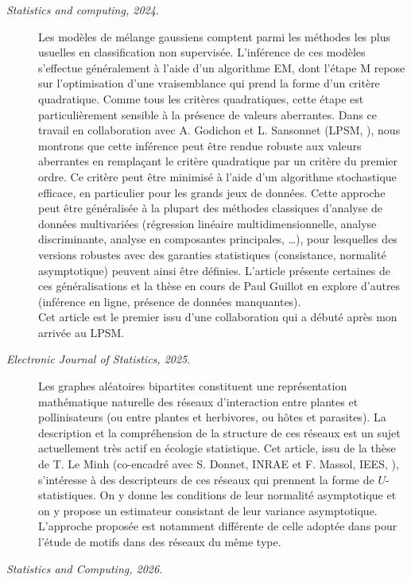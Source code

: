 \begin{description}
  \item[\cite{GoR24} {\sl Statistics and computing, 2024}.] 
  Les modèles de mélange gaussiens comptent parmi les méthodes les plus usuelles en classification non supervisée. 
  L'inférence de ces modèles s'effectue généralement à l'aide d'un algorithme EM, dont l'étape M repose sur l'optimisation d'une vraisemblance qui prend la forme d'un critère quadratique. Comme tous les critères quadratiques, cette étape est particulièrement sensible à la présence de valeurs aberrantes.
  Dans ce travail en collaboration avec A. Godichon et L. Sansonnet (LPSM, \SU), nous montrons que cette inférence peut être rendue robuste aux valeurs aberrantes en remplaçant le critère quadratique par un critère du premier ordre. Ce critère peut être minimisé à l'aide d'un algorithme stochastique efficace, en particulier pour les grands jeux de données. 
  Cette approche peut être généralisée à la plupart des méthodes classiques d'analyse de données multivariées (régression linéaire multidimensionnelle, analyse discriminante, analyse en composantes principales, \dots), pour lesquelles des versions robustes avec des garanties statistiques (consistance, normalité asymptotique) peuvent ainsi être définies. L'article \cite{GRS26} présente certaines de ces généralisations et la thèse en cours de Paul Guillot en explore d'autres (inférence en ligne, présence de données manquantes). \\
  Cet article est le premier issu d'une collaboration qui a débuté après mon arrivée au LPSM.
  \item[\cite{LDM25} {\sl Electronic Journal of Statistics, 2025}.] 
  Les graphes aléatoires bipartites constituent une représentation mathématique naturelle des réseaux d'interaction entre plantes et pollinisateurs (ou entre plantes et herbivores, ou hôtes et parasites). La description et la compréhension de la structure de ces réseaux est un sujet actuellement très actif en écologie statistique. Cet article, issu de la thèse de T. Le Minh (co-encadré avec S. Donnet, INRAE et F. Massol, IEES, \SU), s'intéresse à des descripteurs de ces réseaux qui prennent la forme de $U$-statistiques. On y donne les conditions de leur normalité asymptotique et on y propose un estimateur consistant de leur variance asymptotique. L'approche proposée est notamment différente de celle adoptée dans \cite{OLR22} pour l'étude de motifs dans des réseaux du même type.
  \item[\cite{StR26} {\sl Statistics and Computing, 2026}.] 

\end{description}
